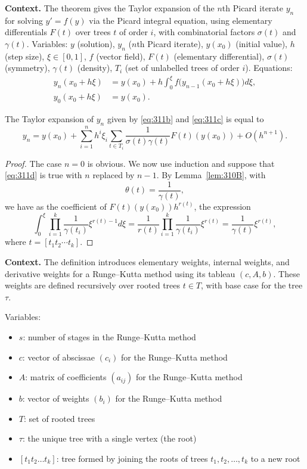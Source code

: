 \noindent\textbf{Context.}
The theorem gives the Taylor expansion of the $n$th Picard iterate $y_n$ for solving $y' = f(y)$ via the Picard integral equation, using elementary differentials $F(t)$ over trees $t$ of order $i$, with combinatorial factors $\sigma(t)$ and $\gamma(t)$. Variables: $y$ (solution), $y_n$ ($n$th Picard iterate), $y(x_0)$ (initial value), $h$ (step size), $\xi\in[0,1]$, $f$ (vector field), $F(t)$ (elementary differential), $\sigma(t)$ (symmetry), $\gamma(t)$ (density), $T_i$ (set of unlabelled trees of order $i$). Equations:
\begin{align}
y_n(x_0+h\xi) &= y(x_0) + h\int_0^\xi f\bigl(y_{n-1}(x_0+h\xi)\bigr)d\xi, \\
y_0(x_0+h\xi) &= y(x_0).
\end{align}

\begin{theorem}

  \label{thm:311D}
The Taylor expansion of $y_n$ given by \eqref{eq:311b} and \eqref{eq:311c} is equal to
\[
y_n = y(x_0) + \sum_{i=1}^n h^i \xi_i \sum_{t \in T_i} \frac{1}{\sigma(t)\gamma(t)} F(t)(y(x_0)) + O(h^{n+1}). \tag{311d}
\]
\end{theorem}

\begin{proof}
The case $n = 0$ is obvious. We now use induction and suppose that \eqref{eq:311d} is true with $n$ replaced by $n - 1$. By Lemma~\ref{lem:310B}, with
\[
\theta(t) = \frac{1}{\gamma(t)},
\]
we have as the coefficient of $F(t)(y(x_0))h^{r(t)}$, the expression
\[
\int_0^\xi \prod_{i=1}^k \frac{1}{\gamma(t_i)} \xi^{r(t)-1} d\xi = \frac{1}{r(t)} \prod_{i=1}^k \frac{1}{\gamma(t_i)} \xi^{r(t)} = \frac{1}{\gamma(t)} \xi^{r(t)},
\]
where $t = [t_1 t_2 \cdots t_k]$.
\end{proof}

\noindent\textbf{Context.}
The definition introduces elementary weights, internal weights, and derivative weights for a Runge--Kutta method using its tableau $(c, A, b)$. These weights are defined recursively over rooted trees $t \in T$, with base case for the tree $\tau$.

Variables:
\begin{itemize}
    \item $s$: number of stages in the Runge--Kutta method
    \item $c$: vector of abscissae $(c_i)$ for the Runge--Kutta method
    \item $A$: matrix of coefficients $(a_{ij})$ for the Runge--Kutta method
    \item $b$: vector of weights $(b_i)$ for the Runge--Kutta method
    \item $T$: set of rooted trees
    \item $\tau$: the unique tree with a single vertex (the root)
    \item $[t_1 t_2 \dots t_k]$: tree formed by joining the roots of trees $t_1, t_2, \dots, t_k$ to a new root
\end{itemize}

